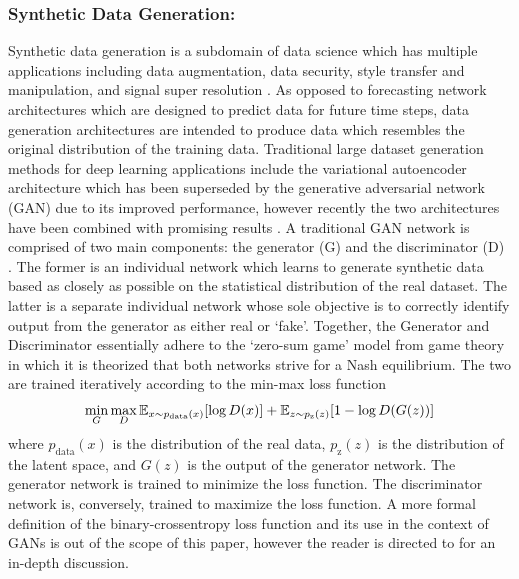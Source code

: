 \documentclass[conference]{IEEEtran}
\begin{document}
\subsubsection*{Synthetic Data Generation:}
Synthetic data generation is a subdomain of data science which has multiple applications including 
data augmentation, data security, style transfer and manipulation, and signal super resolution \cite{surendra_review_2017}. 
As opposed to forecasting network architectures which are designed to predict data for future time steps, 
data generation architectures are intended to produce data which resembles the original distribution of the 
training data. Traditional large dataset generation methods for deep learning applications include the 
variational autoencoder architecture \cite{rezende_stochastic_2014} \cite{kingma_auto-encoding_2014} which 
has been superseded by the generative
adversarial network (GAN) due to its improved performance, however recently the two architectures have been 
combined with promising results \cite{larsen_autoencoding_2016}. A traditional GAN network is comprised of two main components: 
the generator (G) and the discriminator (D) \cite{goodfellow_generative_2014}. The former is an individual network which learns
to generate synthetic data based as closely as possible on the statistical distribution of the real dataset. 
The latter is a separate individual network whose sole objective is to correctly identify output from the 
generator as either real or ‘fake’. Together, the Generator and Discriminator essentially adhere to the 
‘zero-sum game’ model from game theory in which it is theorized that both networks strive for a Nash equilibrium. 
The two are trained iteratively according to the min-max loss function
\begin{equation}
  \min_{G}\max_{D}\mathbb{E}_{x\sim p_{\text{data}}(x)}[\log{D(x)}] + \\ \mathbb{E}_{z\sim p_{\text{z}}(z)}[1 - \log{D(G(z))}]
\end{equation}
where $p_{\text{data}}(x)$ is the distribution of the real data, $p_{\text{z}}(z)$ is the distribution of the
latent space, and $G(z)$ is the output of the generator network. The generator network is trained to minimize
the loss function. The 
discriminator network is, conversely, trained to maximize the loss function. A more formal definition of the binary-crossentropy loss function and its use
in the context of GANs is out of the scope of this paper, however the reader is directed to \cite{goodfellow_generative_2014}
for an in-depth discussion.
\end{document}
